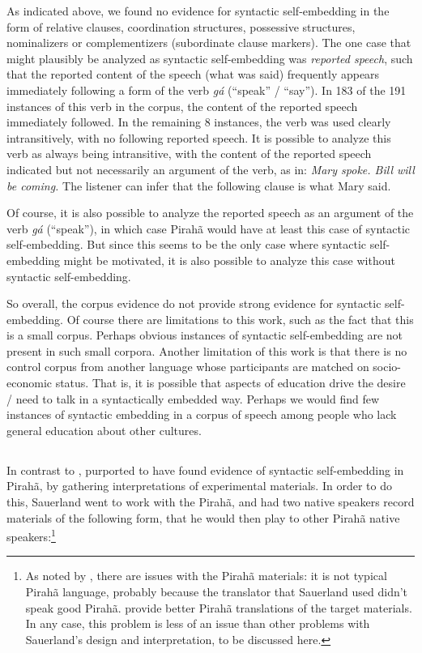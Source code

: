 \documentclass{article}
\begin{document}
As indicated above, we found no evidence for syntactic self-embedding in the form of relative clauses, coordination structures, possessive structures, nominalizers or complementizers (subordinate clause markers). The one case that might plausibly be analyzed as syntactic self-embedding was \textit{reported speech}, such that the reported content of the speech (what was said) frequently appears immediately following a form of the verb \textit{gá} (``speak'' / ``say''). In 183 of the 191 instances of this verb in the corpus, the content of the reported speech immediately followed. In the remaining 8 instances, the verb was used clearly intransitively, with no following reported speech. It is possible to analyze this verb as always being intransitive, with the content of the reported speech indicated but not necessarily an argument of the verb, as in:  \textit{Mary spoke.  Bill will be coming.}  The listener can infer that the following clause is what Mary said.  

Of course, it is also possible to analyze the reported speech as an argument of the verb \textit{gá} (``speak''), in which case Pirahã would have at least this case of syntactic self-embedding.  But since this seems to be the only case where syntactic self-embedding might be motivated, it is also possible to analyze this case without syntactic self-embedding.

So overall, the corpus evidence do not provide strong evidence for syntactic self-embedding. Of course there are limitations to this work, such as the fact that this is a small corpus.  Perhaps obvious instances of syntactic self-embedding are not present in such small corpora.  Another limitation of this work is that there is no control corpus from another language whose participants are matched on socio-economic status.  That is, it is possible that aspects of education drive the desire / need to talk in a syntactically embedded way.  Perhaps we would find few instances of syntactic embedding in a corpus of speech among people who lack general education about other cultures.

\subsection{}
\label{sauerland_sec}

In contrast to \cite{futrell2016corpus}, \cite{sauerland2018false} purported to have found evidence of syntactic self-embedding in Pirahã, by gathering interpretations of experimental materials. In order to do this, Sauerland went to work with the Pirahã, and had two native speakers record materials of the following form, that he would then play to other Pirahã native speakers:\footnote{As noted by \cite{everett2019recursion}, there are issues with the Pirahã materials: it is not typical Pirahã language, probably because the translator that Sauerland used didn't speak good Pirahã. \cite{everett2019recursion} provide better Pirahã translations of the target materials. In any case, this problem is less of an issue than other problems with Sauerland's design and interpretation, to be discussed here.}
\end{document}
